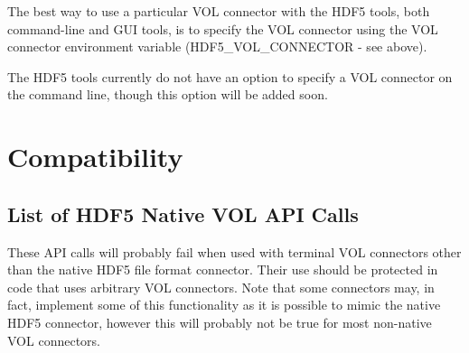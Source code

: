 The best way to use a particular VOL connector with the HDF5 tools, both command-line and GUI tools, is to specify the VOL connector using the VOL connector environment variable (HDF5\_VOL\_CONNECTOR - see above).

The HDF5 tools currently do not have an option to specify a VOL connector on the command line, though this option will be added soon.

\section{Compatibility}

\subsection{List of HDF5 Native VOL API Calls}

These API calls will probably fail when used with terminal VOL connectors other than the native HDF5 file format connector. Their use should be protected in code that uses arbitrary VOL connectors. Note that some connectors may, in fact, implement some of this functionality as it is possible to mimic the native HDF5 connector, however this will probably not be true for most non-native VOL connectors.

